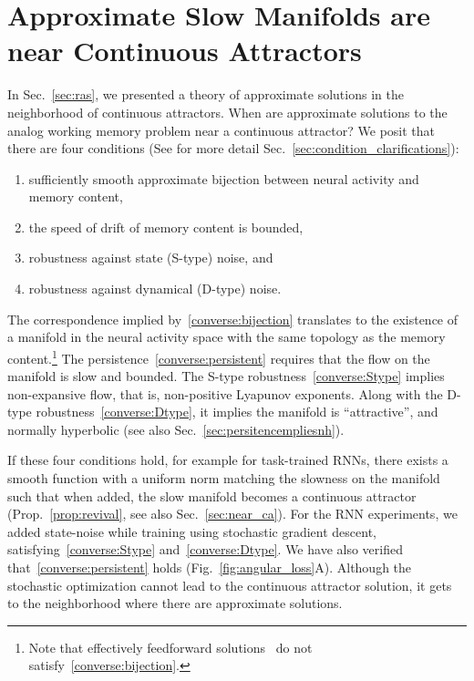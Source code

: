 \documentclass{article} %
\newcounter{ct}
\theoremstyle{definition}
\theoremstyle{remark}
\begin{document}
\section{Approximate Slow Manifolds are near Continuous Attractors}\label{sec:converse}
In Sec.~\ref{sec:ras}, we presented a theory of approximate solutions in the neighborhood of continuous attractors.
When are approximate solutions to the analog working memory problem near a continuous attractor?
We posit that there are four conditions (See for more detail Sec.~\ref{sec:condition_clarifications}):
\begin{enumerate}[label=\textbf{(C\arabic*)}]
\item sufficiently smooth approximate bijection between neural activity and memory content,\label{converse:bijection}
\item the speed of drift of memory content is bounded,\label{converse:persistent}
\item robustness against state (S-type) noise, and\label{converse:Stype}
\item robustness against dynamical (D-type) noise.\label{converse:Dtype}
\end{enumerate}
The correspondence implied by~\ref{converse:bijection} translates to the existence of a manifold in the neural activity space with the same topology as the memory content.\footnote{Note that effectively feedforward solutions~\citep{Goldman2009} do not satisfy~\ref{converse:bijection}.}
The persistence~\ref{converse:persistent} requires that the flow on the manifold is slow and bounded.
The S-type robustness~\ref{converse:Stype} implies non-expansive flow, that is, non-positive Lyapunov exponents.
Along with the D-type robustness~\ref{converse:Dtype}, it implies the manifold is ``attractive'', and normally hyperbolic (see also Sec.~\ref{sec:persitencempliesnh}).

If these four conditions hold, for example for task-trained RNNs, there exists a smooth function with a uniform norm matching the slowness on the manifold such that when added, the slow manifold becomes a continuous attractor (Prop.~\ref{prop:revival}, see also Sec.~\ref{sec:near_ca}).
For the RNN experiments, we added state-noise while training using stochastic gradient descent, satisfying~\ref{converse:Stype} and~\ref{converse:Dtype}.
We have also verified that~\ref{converse:persistent} holds (Fig.~\ref{fig:angular_loss}A).
Although the stochastic optimization cannot lead to the continuous attractor solution, it gets to the neighborhood where there are approximate solutions.
\end{document}
